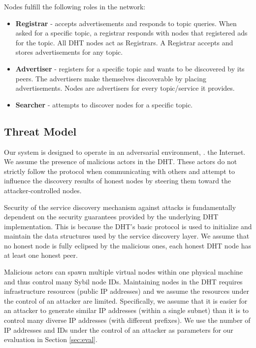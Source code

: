 Nodes fulfill the following roles in the network:

\begin{itemize}
    \item \textbf{Registrar} - accepts advertisements and responds to topic queries. When asked for a specific topic, a registrar responds with nodes that registered ads for the topic.  All DHT nodes act as Registrars. A Registrar accepts and stores advertisements for any topic.
    \item \textbf{Advertiser} - registers for a specific topic and wants to be discovered by its peers. The advertisers make themselves discoverable by placing advertisements. Nodes are advertisers for every topic/service it provides.
    \item \textbf{Searcher} - attempts to discover nodes for a specific topic.
\end{itemize}

\subsection{Threat Model}
Our system is designed to operate in an adversarial environment, \ie. the Internet. We assume the presence of malicious actors in the DHT. These actors do not strictly follow the protocol when communicating with others and attempt to influence the discovery results of honest nodes by steering them toward the attacker-controlled nodes.

Security of the service discovery mechanism against attacks is fundamentally dependent on the security guarantees provided by the underlying DHT implementation. This is because the DHT's basic protocol is used to initialize and maintain the data structures used by the service discovery layer. We assume that no honest node is fully eclipsed by the malicious ones, \ie each honest DHT node has at least one honest peer. 

Malicious actors can spawn multiple virtual nodes within one physical machine and thus control many Sybil node IDs. Maintaining nodes in the DHT requires infrastructure resources (public IP addresses) and we assume the resources under the control of an attacker are limited. Specifically, we assume that it is easier for an attacker to generate similar IP addresses (\ie within a single subnet) than it is to control many diverse IP addresses (with different prefixes). We use the number of IP addresses and IDs under the control of an attacker as parameters for our evaluation in Section \ref{sec:eval}.

